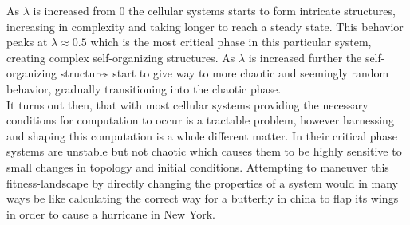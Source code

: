 As $\lambda$ is increased from 0 the cellular systems starts to form intricate
structures, increasing in complexity and taking longer to reach a steady state.
This behavior peaks at $\lambda \approx 0.5$ which is the most critical phase in this
particular system, creating complex self-organizing structures.
As $\lambda$ is increased further the self-organizing structures start to give
way to more chaotic and seemingly random behavior, gradually transitioning into
the chaotic phase.\\
It turns out then, that with most cellular systems providing the necessary
conditions for computation to occur is a tractable problem, however harnessing
and shaping this computation is a whole different matter.
In their critical phase systems are unstable but not chaotic which causes them to
be highly sensitive to small changes in topology and initial conditions.
Attempting to maneuver this fitness-landscape by directly changing the
properties of a system would in many ways be like calculating the correct way
for a butterfly in china to flap its wings in order to cause a hurricane in New York.\\
